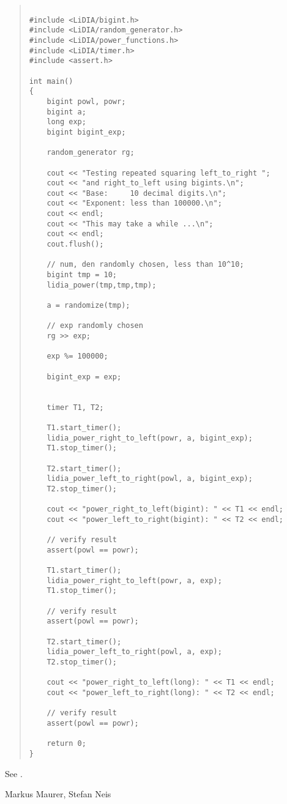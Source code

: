 \begin{quote}
\begin{verbatim}

#include <LiDIA/bigint.h>
#include <LiDIA/random_generator.h>
#include <LiDIA/power_functions.h>
#include <LiDIA/timer.h>
#include <assert.h>

int main()
{
    bigint powl, powr;
    bigint a;
    long exp;
    bigint bigint_exp;

    random_generator rg;

    cout << "Testing repeated squaring left_to_right ";
    cout << "and right_to_left using bigints.\n";
    cout << "Base:     10 decimal digits.\n";
    cout << "Exponent: less than 100000.\n";
    cout << endl;
    cout << "This may take a while ...\n";
    cout << endl;
    cout.flush();

    // num, den randomly chosen, less than 10^10;
    bigint tmp = 10;
    lidia_power(tmp,tmp,tmp);

    a = randomize(tmp);

    // exp randomly chosen
    rg >> exp;

    exp %= 100000;

    bigint_exp = exp;


    timer T1, T2;

    T1.start_timer();
    lidia_power_right_to_left(powr, a, bigint_exp);
    T1.stop_timer();

    T2.start_timer();
    lidia_power_left_to_right(powl, a, bigint_exp);
    T2.stop_timer();

    cout << "power_right_to_left(bigint): " << T1 << endl;
    cout << "power_left_to_right(bigint): " << T2 << endl;

    // verify result
    assert(powl == powr);

    T1.start_timer();
    lidia_power_right_to_left(powr, a, exp);
    T1.stop_timer();

    // verify result
    assert(powl == powr);

    T2.start_timer();
    lidia_power_left_to_right(powl, a, exp);
    T2.stop_timer();

    cout << "power_right_to_left(long): " << T1 << endl;
    cout << "power_left_to_right(long): " << T2 << endl;

    // verify result
    assert(powl == powr);

    return 0;
}
\end{verbatim}
\end{quote}

See .



\AUTHOR

Markus Maurer, Stefan Neis
